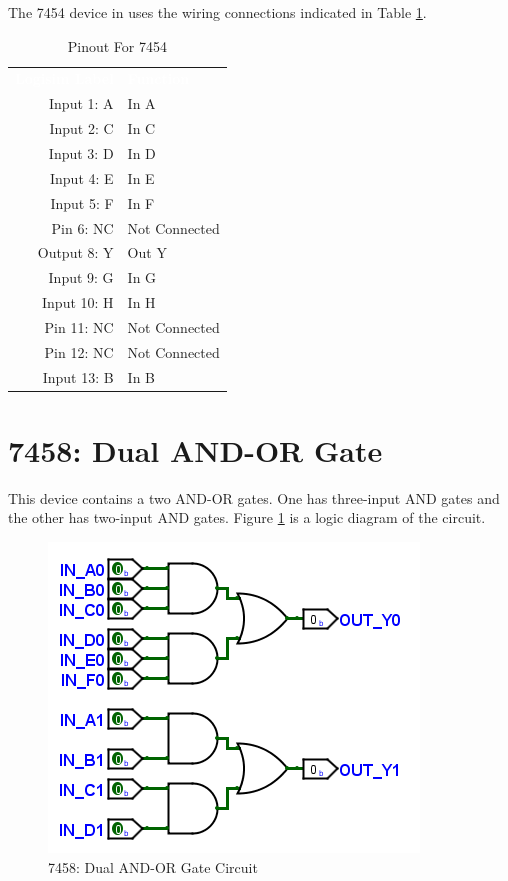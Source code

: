 The 7454 device in \LE uses the wiring connections indicated in Table \ref{tab:50-7454}.

\begin{table}[H]
	\sffamily
	\newcommand{\head}[1]{\textcolor{white}{\textbf{#1}}}		
	\begin{center}
		\begin{tabular}{rl} 
			\rowcolor{black!75}
			\head{Logisim Label} & \head{Function} \\
			Input 1: A   & In A          \\
			Input 2: C   & In C          \\
			Input 3: D   & In D          \\
			Input 4: E   & In E          \\
			Input 5: F   & In F          \\
			Pin 6: NC    & Not Connected \\
			Output 8: Y  & Out Y         \\
			Input 9: G   & In G          \\
			Input 10: H  & In H          \\
			Pin 11: NC   & Not Connected \\
			Pin 12: NC   & Not Connected \\
			Input 13: B  & In B          \\
		\end{tabular}
	\end{center}
	\caption{Pinout For 7454}
	\label{tab:50-7454}
\end{table}

\section{7458: Dual AND-OR Gate}

This device contains a two AND-OR gates. One has three-input AND gates and the other has two-input AND gates. Figure \ref{fig:app_ttl-7458} is a logic diagram of the circuit.

\begin{figure}[H]
	\centering
	\includegraphics{gfx/app_ttl-7458}
	\caption{7458: Dual AND-OR Gate Circuit}
	\label{fig:app_ttl-7458}
\end{figure}

